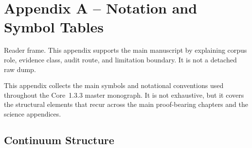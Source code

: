 
\section{Appendix A -- Notation and Symbol Tables}
Reader frame. This appendix supports the main manuscript by explaining corpus role, evidence class, audit route, and limitation boundary. It is not a detached raw dump.

\label{app:notation}

This appendix collects the main symbols and notational conventions used
throughout the Core~1.3.3 master monograph. It is not exhaustive, but it covers
the structural elements that recur across the main proof-bearing chapters and
the science appendices.

\begingroup
\footnotesize
\RaggedRight
\sloppy

\subsection{Continuum Structure}

